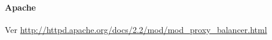 \paragraph{Apache}
\label{soa:tecnologias:apache}

Ver \url{http://httpd.apache.org/docs/2.2/mod/mod_proxy_balancer.html}
